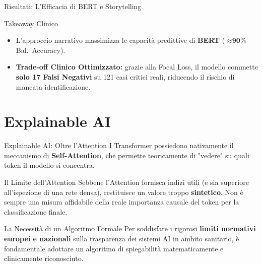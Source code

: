 \documentclass[aspectratio=169, 10pt]{beamer}
\begin{document}
\begin{frame}{Risultati: L'Efficacia di BERT e Storytelling}
  \vspace{1.5em}
  \begin{exampleblock}{Takeaway Clinico}
    \begin{itemize}
      \item[\faCheckCircle] L'approccio narrativo massimizza le capacità predittive di \textbf{BERT} ($\approx \textbf{90\%}$ Bal.\ Accuracy).
      \item[\faCheckCircle] \textbf{Trade-off Clinico Ottimizzato:} grazie alla Focal Loss, il modello commette \textbf{solo 17 Falsi Negativi} su 121 casi critici reali, riducendo il rischio di mancata identificazione.
    \end{itemize}
  \end{exampleblock}
\end{frame}

\section{Explainable AI}

\begin{frame}{Explainable AI: Oltre l'Attention}
  I Transformer possiedono nativamente il meccanismo di \textbf{Self-Attention}, che 
  permette teoricamente di "vedere" su quali token il modello si concentra.
  
  \vspace{1em}
  \begin{alertblock}{Il Limite dell'Attention}
    Sebbene l'Attention fornisca indizi utili (e sia superiore all'ispezione di una rete densa), 
    restituisce un valore troppo \textbf{sintetico}. Non è sempre una misura affidabile della 
    reale importanza causale del token per la classificazione finale.
  \end{alertblock}

  \vspace{1em}
  \begin{block}{La Necessità di un Algoritmo Formale}
    Per soddisfare i rigorosi \textbf{limiti normativi europei e nazionali} 
    sulla trasparenza dei sistemi AI in ambito sanitario, è fondamentale
    adottare un algoritmo di spiegabilità matematicamente e clinicamente riconosciuto.
  \end{block}
\end{frame}
\end{document}
